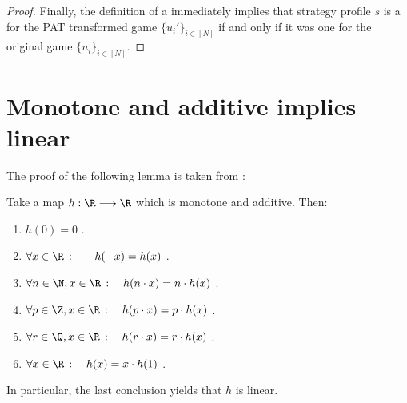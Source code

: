 \begin{proof}
Finally, the definition of a \NE{} immediately implies that strategy profile $s$ is a \NE{} for the PAT transformed game $\{u_i'\}_{i \in [N]}$ if and only if it was one for the original game $\{u_i\}_{i \in [N]}$.
\end{proof}


\section{Monotone and additive implies linear}
\label{sec:analysislemma}
The proof of the following lemma is taken from \cite{monadd1, monadd2}:
\begin{lemma*}
Take a map $h: \R \longrightarrow \R$ which is monotone and additive. Then:
\begin{enumerate}

\item $ h(0) = 0 $ .
\item \label{hihi} $ \forall x \in \R \, : \quad -h(-x) = h(x) $ .
\item $ \forall n \in \N, x \in \R \, : \quad h(n \cdot x) = n \cdot h(x) $ .
\item $ \forall p \in \Z, x \in \R \, : \quad h(p \cdot x) = p \cdot h(x) $ .
\item $ \forall r \in \Q, x \in \R \, : \quad h(r \cdot x) = r \cdot h(x) $ .
\item $ \forall x \in \R \, : \quad h(x) = x \cdot h(1) $ .
\end{enumerate}
In particular, the last conclusion yields that $h$ is linear.
\end{lemma*}
